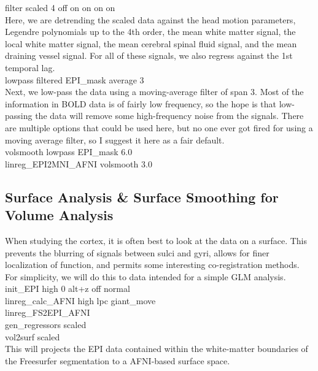 \documentclass[final,titlepage,letterpaper,oneside,12pt]{article}
\renewcommand{\texttt}[2][BrickRed]{\textcolor{#1}{\ttfamily #2}}%
\begin{document}
\noindent
\texttt{filter scaled 4 off on on on on} \\

Here, we are detrending the scaled data against the head motion parameters, Legendre polynomials up to the 4th order, the mean white matter signal, the local white matter signal, the mean cerebral spinal fluid signal, and the mean draining vessel signal. For all of these signals, we also regress against the 1st temporal lag. \\

\noindent
\texttt{lowpass filtered EPI\_mask average 3} \\

Next, we low-pass the data using a moving-average filter of span 3. Most of the information in BOLD data is of fairly low frequency, so the hope is that low-passing the data will remove some high-frequency noise from the signals. There are multiple options that could be used here, but no one ever got fired for using a moving average filter, so I suggest it here as a fair default.\\

\noindent
\texttt{volsmooth lowpass EPI\_mask 6.0} \\
\texttt{linreg\_EPI2MNI\_AFNI volsmooth 3.0} \\

\subsection{Surface Analysis \& Surface Smoothing for Volume Analysis}

When studying the cortex, it is often best to look at the data on a surface. This prevents the blurring of signals between sulci and gyri, allows for finer localization of function, and permits some interesting co-registration methods. For simplicity, we will do this to data intended for a simple GLM analysis. \\

\noindent
\texttt{init\_EPI high 0 alt+z off normal} \\
\texttt{linreg\_calc\_AFNI high lpc giant\_move} \\
\texttt{linreg\_FS2EPI\_AFNI} \\
\texttt{gen\_regressors scaled} \\

\noindent
\texttt{vol2surf scaled} \\

This will projects the EPI data contained within the white-matter boundaries of the Freesurfer segmentation to a AFNI-based surface space. \\
\end{document}
